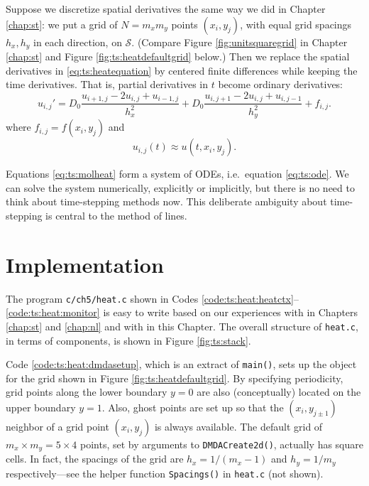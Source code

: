 Suppose we discretize spatial derivatives the same way we did in Chapter \ref{chap:st}: we put a grid of $N = m_x m_y$ points $(x_i,y_j)$, with equal grid spacings $h_x,h_y$ in each direction, on $\mathcal{S}$.  (Compare Figure \ref{fig:unitsquaregrid} in Chapter \ref{chap:st} and Figure \ref{fig:ts:heatdefaultgrid} below.)  Then we replace the spatial derivatives in \eqref{eq:ts:heatequation} by centered finite differences while keeping the time derivatives.  That is, partial derivatives in $t$ become ordinary derivatives:
\begin{equation}
u_{i,j}' = D_0 \frac{u_{i+1,j} - 2 u_{i,j} + u_{i-1,j}}{h_x^2} + D_0 \frac{u_{i,j+1} - 2 u_{i,j} + u_{i,j-1}}{h_y^2} + f_{i,j}. \label{eq:ts:molheat}
\end{equation}
where $f_{i,j} = f(x_i,y_j)$ and
\begin{equation}
u_{i,j}(t) \approx u(t,x_i,y_j). \label{eq:ts:molumeaning}
\end{equation}

Equations \eqref{eq:ts:molheat} form a system of ODEs, i.e.~equation \eqref{eq:ts:ode}.  We can solve the system numerically, explicitly or implicitly, but there is no need to think about time-stepping methods now.  This deliberate ambiguity about time-stepping is central to the method of lines.


\section{Implementation}

The program \texttt{c/ch5/heat.c} shown in Codes \ref{code:ts:heat:heatctx}--\ref{code:ts:heat:monitor} is easy to write based on our experiences with \pDMDA in Chapters \ref{chap:st} and \ref{chap:nl} and with \pTS in this Chapter.   The overall structure of \texttt{heat.c}, in terms of \PETSc components, is shown in Figure \ref{fig:ts:stack}.


Code \ref{code:ts:heat:dmdasetup}, which is an extract of \texttt{main()}, sets up the \pDMDA object for the grid shown in Figure \ref{fig:ts:heatdefaultgrid}.  By specifying periodicity, grid points along the lower boundary $y=0$ are also (conceptually) located on the upper boundary $y=1$.  Also, ghost points are set up so that the $(x_i,y_{j\pm 1})$ neighbor of a grid point $(x_i,y_j)$ is always available.  The default grid of $m_x \times m_y = 5\times 4$ points, set by arguments to \texttt{DMDACreate2d()}, actually has square cells.  In fact, the spacings of the grid are $h_x=1/(m_x-1)$ and $h_y=1/m_y$ respectively---see the helper function \texttt{Spacings()} in \texttt{heat.c} (not shown).

